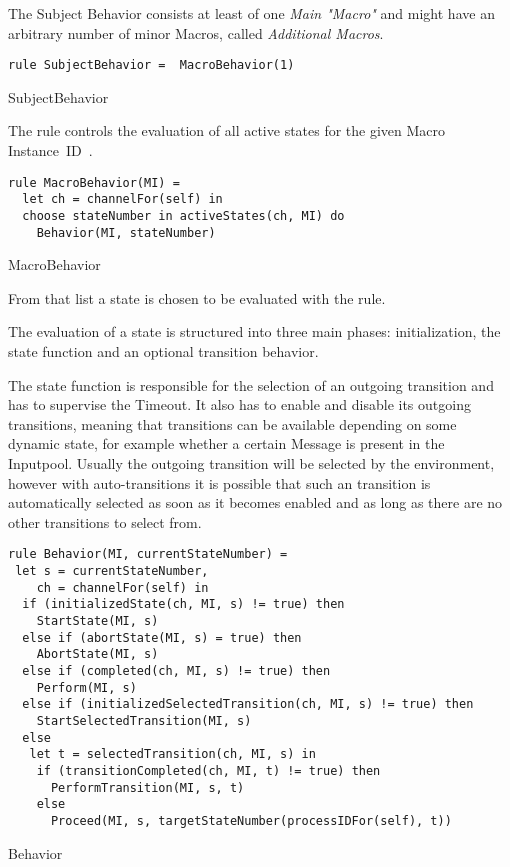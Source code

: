 The Subject Behavior consists at least of one \textit{Main "Macro"} and might have an arbitrary number of minor Macros, called \textit{Additional Macros}. 


\begin{listing}[htbp]
\begin{verbatim} 
rule SubjectBehavior =  MacroBehavior(1)
\end{verbatim}
\caption{SubjectBehavior}
\label{lst:shortasm:SubjectBehavior}
\end{listing}




The  rule controls the evaluation of all active states for the given Macro Instance~ID~.


\begin{listing}[htbp]
\begin{verbatim}
rule MacroBehavior(MI) =
  let ch = channelFor(self) in
  choose stateNumber in activeStates(ch, MI) do
    Behavior(MI, stateNumber)
\end{verbatim}
\caption{MacroBehavior}
\label{lst:shortasm:MacroBehavior}
\end{listing}

From that list a state  is chosen to be evaluated with the  rule.


The evaluation of a state is structured into three main phases: initialization, the state function and an optional transition behavior.

The state function is responsible for the selection of an outgoing transition and has to supervise the Timeout. It also has to enable and disable its outgoing transitions, meaning that transitions can be available depending on some dynamic state, for example whether a certain Message is present in the Inputpool. Usually the outgoing transition will be selected by the environment, however with auto-transitions it is possible that such an transition is automatically selected as soon as it becomes enabled and as long as there are no other transitions to select from.


\begin{listing}[htbp]
\begin{verbatim}
rule Behavior(MI, currentStateNumber) =
 let s = currentStateNumber,
    ch = channelFor(self) in
  if (initializedState(ch, MI, s) != true) then
    StartState(MI, s)
  else if (abortState(MI, s) = true) then
    AbortState(MI, s)
  else if (completed(ch, MI, s) != true) then
    Perform(MI, s)
  else if (initializedSelectedTransition(ch, MI, s) != true) then
    StartSelectedTransition(MI, s)
  else
   let t = selectedTransition(ch, MI, s) in
    if (transitionCompleted(ch, MI, t) != true) then
      PerformTransition(MI, s, t)
    else
      Proceed(MI, s, targetStateNumber(processIDFor(self), t))
\end{verbatim}
\caption{Behavior}
\label{lst:shortasm:Behavior}
\end{listing}


